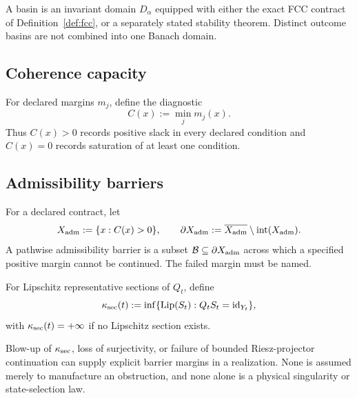 \documentclass[11pt]{article}
\theoremstyle{plain}
\theoremstyle{plain}
\begin{document}
\begin{definition}[Basin]
A basin is an invariant domain $D_\alpha$ equipped with either the exact FCC
contract of Definition~\ref{def:fcc}, or a separately stated stability
theorem.  Distinct outcome basins are not combined into one Banach domain.
\end{definition}

\subsection{Coherence capacity}

\begin{definition}
For declared margins $m_j$, define the diagnostic
\[
C(x):=\min_j m_j(x).
\]
Thus $C(x)>0$ records positive slack in every declared condition and
$C(x)=0$ records saturation of at least one condition.
\end{definition}

\subsection{Admissibility barriers}

\begin{definition}\label{def:admissibility-barrier}
For a declared contract, let
\[
X_{\rm adm}:=\{x:C(x)>0\},
\qquad
\partial X_{\rm adm}:=\overline{X_{\rm adm}}
   \setminus\operatorname{int}(X_{\rm adm}).
\]
A pathwise admissibility barrier is a subset
$\mathcal B\subseteq\partial X_{\rm adm}$ across which a specified positive
margin cannot be continued.  The failed margin must be named.
\end{definition}

\begin{definition}
For Lipschitz representative sections of $Q_t$, define
\[
\kappa_{\rm sec}(t):=
\inf\{\operatorname{Lip}(S_t):Q_tS_t=\operatorname{id}_{Y_t}\},
\]
with $\kappa_{\rm sec}(t)=+\infty$ if no Lipschitz section exists.
\end{definition}

\begin{remark}
Blow-up of $\kappa_{\rm sec}$, loss of surjectivity, or failure of bounded
Riesz-projector continuation can supply explicit barrier margins in a
realization.  None is assumed merely to manufacture an obstruction, and none
alone is a physical singularity or state-selection law.
\end{remark}
\end{document}
